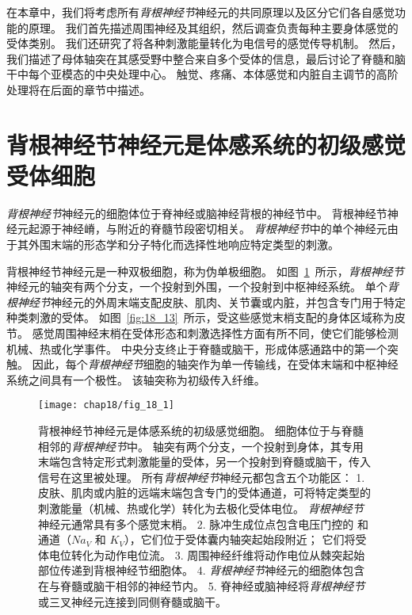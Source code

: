 在本章中，我们将考虑所有\textit{背根神经节}神经元的共同原理以及区分它们各自感觉功能的原理。
我们首先描述周围神经及其组织，然后调查负责每种主要身体感觉的受体类别。
我们还研究了将各种刺激能量转化为电信号的感觉传导机制。
然后，我们描述了母体轴突在其感受野中整合来自多个受体的信息，最后讨论了脊髓和脑干中每个亚模态的中央处理中心。
触觉、疼痛、本体感觉和内脏自主调节的高阶处理将在后面的章节中描述。



\section{背根神经节神经元是体感系统的初级感觉受体细胞}

\textit{背根神经节}神经元的细胞体位于脊神经或脑神经背根的神经节中。
背根神经节神经元起源于神经嵴，与附近的脊髓节段密切相关。
\textit{背根神经节}中的单个神经元由于其外围末端的形态学和分子特化而选择性地响应特定类型的刺激。


背根神经节神经元是一种双极细胞，称为伪单极细胞。 
如图~\ref{fig:18_1}~所示，\textit{背根神经节}神经元的轴突有两个分支，一个投射到外围，一个投射到中枢神经系统。
单个\textit{背根神经节}神经元的外周末端支配皮肤、肌肉、关节囊或内脏，并包含专门用于特定种类刺激的受体。 
如图~\ref{fig:18_13}~所示，受这些感觉末梢支配的身体区域称为皮节。
感觉周围神经末梢在受体形态和刺激选择性方面有所不同，使它们能够检测机械、热或化学事件。
中央分支终止于脊髓或脑干，形成体感通路中的第一个突触。
因此，每个\textit{背根神经节}细胞的轴突作为单一传输线，在受体末端和中枢神经系统之间具有一个极性。
该轴突称为初级传入纤维。


\begin{figure}[htbp]
	\centering
	\texttt{[image: chap18/fig\_18\_1]}
	\caption{背根神经节神经元是体感系统的初级感觉细胞。 
		细胞体位于与脊髓相邻的\textit{背根神经节}中。
		轴突有两个分支，一个投射到身体，其专用末端包含特定形式刺激能量的受体，另一个投射到脊髓或脑干，传入信号在这里被处理。 
		所有\textit{背根神经节}神经元都包含五个功能区：
		1. 皮肤、肌肉或内脏的远端末端包含专门的受体通道，可将特定类型的刺激能量（机械、热或化学）转化为去极化受体电位。 
		\textit{背根神经节}神经元通常具有多个感觉末梢。
		2. 脉冲生成位点包含电压门控的  和  通道（$Na_V$ 和 $K_V$），它们位于受体囊内轴突起始段附近； 它们将受体电位转化为动作电位流。 
		3. 周围神经纤维将动作电位从棘突起始部位传递到背根神经节细胞体。 
		4. \textit{背根神经节}神经元的细胞体包含在与脊髓或脑干相邻的神经节内。 
		5. 脊神经或脑神经将\textit{背根神经节}或三叉神经元连接到同侧脊髓或脑干。}
	\label{fig:18_1}
\end{figure}


